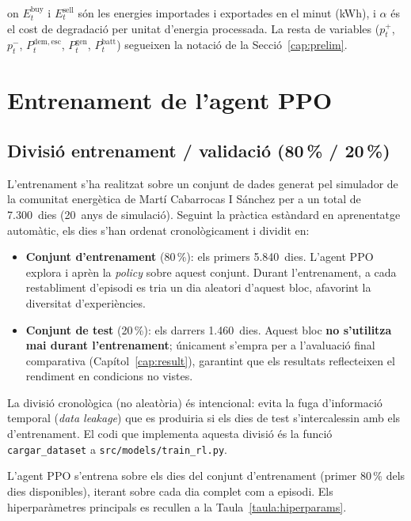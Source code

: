 \documentclass[a4paper,12pt,twoside]{ThesisStyle}
\begin{document}
on $E_t^{\mathrm{buy}}$ i $E_t^{\mathrm{sell}}$ són les energies importades i exportades en el minut (kWh), i $\alpha$ és el cost de degradació per unitat d'energia processada. La resta de variables ($p_t^+$, $p_t^-$, $P_t^{\mathrm{dem,esc}}$, $P_t^{\mathrm{gen}}$, $P_t^{\mathrm{batt}}$) segueixen la notació de la Secció~\ref{cap:prelim}.

\section{Entrenament de l'agent PPO}

\subsection{Divisió entrenament / validació (80\,\% / 20\,\%)}

L'entrenament s'ha realitzat sobre un conjunt de dades generat pel simulador de la comunitat energètica de Martí Cabarrocas I Sánchez per a un total de 7.300~dies (20~anys de simulació). Seguint la pràctica estàndard en aprenentatge automàtic, els dies s'han ordenat cronològicament i dividit en:
\begin{itemize}
    \item \textbf{Conjunt d'entrenament} (80\,\%): els primers 5.840~dies. L'agent PPO explora i aprèn la \textit{policy} sobre aquest conjunt. Durant l'entrenament, a cada restabliment d'episodi es tria un dia aleatori d'aquest bloc, afavorint la diversitat d'experiències.
    \item \textbf{Conjunt de test} (20\,\%): els darrers 1.460~dies. Aquest bloc \textbf{no s'utilitza mai durant l'entrenament}; únicament s'empra per a l'avaluació final comparativa (Capítol~\ref{cap:result}), garantint que els resultats reflecteixen el rendiment en condicions no vistes.
\end{itemize}

La divisió cronològica (no aleatòria) és intencional: evita la fuga d'informació temporal (\textit{data leakage}) que es produiria si els dies de test s'intercalessin amb els d'entrenament. El codi que implementa aquesta divisió és la funció \texttt{cargar\_dataset} a \texttt{src/models/train\_rl.py}.

L'agent PPO s'entrena sobre els dies del conjunt d'entrenament (primer 80\,\% dels dies disponibles), iterant sobre cada dia complet com a episodi. Els hiperparàmetres principals es recullen a la Taula~\ref{taula:hiperparams}.
\end{document}
